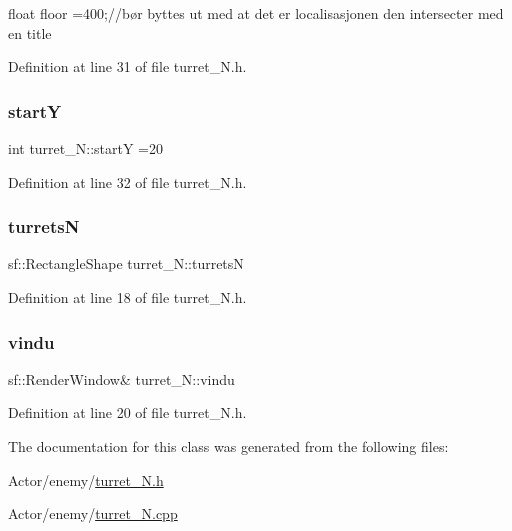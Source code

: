 float floor =400;//bør byttes ut med at det er localisasjonen den intersecter med en title 



Definition at line 31 of file turret\+\_\+\+N.\+h.

\hypertarget{classturret___n_afe109f7f624c558205ab3bae289005e8}{}\label{classturret___n_afe109f7f624c558205ab3bae289005e8} 
\subsubsection{\texorpdfstring{startY}{startY}}
{\footnotesize\ttfamily int turret\+\_\+\+N\+::startY =20}



Definition at line 32 of file turret\+\_\+\+N.\+h.

\hypertarget{classturret___n_a6edaacb80428d92f25c1a30a67c45ae4}{}\label{classturret___n_a6edaacb80428d92f25c1a30a67c45ae4} 
\subsubsection{\texorpdfstring{turretsN}{turretsN}}
{\footnotesize\ttfamily sf\+::\+Rectangle\+Shape turret\+\_\+\+N\+::turretsN}



Definition at line 18 of file turret\+\_\+\+N.\+h.

\hypertarget{classturret___n_aea8c82bfa73c265828e06d1f34d2bd25}{}\label{classturret___n_aea8c82bfa73c265828e06d1f34d2bd25} 
\subsubsection{\texorpdfstring{vindu}{vindu}}
{\footnotesize\ttfamily sf\+::\+Render\+Window\& turret\+\_\+\+N\+::vindu}



Definition at line 20 of file turret\+\_\+\+N.\+h.



The documentation for this class was generated from the following files\+:\begin{DoxyCompactItemize}
\item 
Actor/enemy/\hyperlink{turret___n_8h}{turret\+\_\+\+N.\+h}\item 
Actor/enemy/\hyperlink{turret___n_8cpp}{turret\+\_\+\+N.\+cpp}\end{DoxyCompactItemize}
